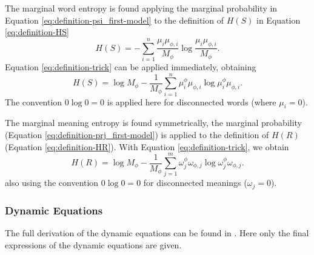 The marginal word entropy is found applying the marginal probability in Equation \eqref{eq:definition-psi_first-model} to the definition of $H(S)$ in Equation \eqref{eq:definition-HS}
\begin{equation*}
  H(S) = -\sum_{i=1}^n \frac{\mu_i \mu_{\phi,i}}{M_\phi} \log \frac{\mu_i \mu_{\phi,i}}{M_\phi}.
\end{equation*}
Equation \eqref{eq:definition-trick} can be applied immediately, obtaining
\begin{equation}
  \label{eq:definition-HS_first-model}
  H(S) = \log M_\phi - \frac{1}{M_\phi} \sum_{i=1}^n \mu_i^\phi \mu_{\phi,i} \log \mu_i^\phi \mu_{\phi,i}.
\end{equation}
The convention $0 \log 0 = 0$ is applied here for disconnected words (where $\mu_i = 0$).

The marginal meaning entropy is found symmetrically, the marginal probability (Equation \eqref{eq:definition-prj_first-model}) is applied to the definition of $H(R)$ (Equation \eqref{eq:definition-HR}).
With Equation \eqref{eq:definition-trick}, we obtain
\begin{equation}
  \label{eq:definition-HR_first-model}
  H(R) = \log M_\phi - \frac{1}{M_\phi} \sum_{j=1}^m \omega_j^\phi \omega_{\phi,j} \log \omega_j^\phi \omega_{\phi,j}.
\end{equation}
also using the convention $0 \log 0 = 0$ for disconnected meanings ($\omega_j=0$).

\subsubsection{Dynamic Equations}

The full derivation of the dynamic equations can be found in \cite{Carrera2021a}.
Here only the final expressions of the dynamic equations are given.


